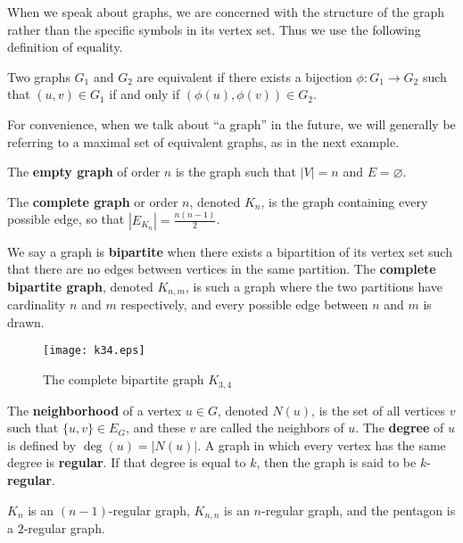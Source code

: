 When we speak about graphs, we are concerned with the structure of the graph
rather than the specific symbols in its vertex set. Thus we use the following
definition of equality.

\begin{definition}
  Two graphs $G_1$ and $G_2$ are equivalent if there exists a bijection $\phi : G_1 \to G_2$
  such that $(u,v) \in G_1$ if and only if $(\phi(u),\phi(v)) \in G_2$.
\end{definition}

For convenience, when we talk about ``a graph'' in the future, we will generally be referring to a
maximal set of equivalent graphs, as in the next example.

\begin{example}
  The \textbf{empty graph} of order $n$ is the graph such that $|V| = n$ and $E
  = \varnothing$.

  The \textbf{complete graph} or order $n$, denoted $K_n$, is the graph containing every possible
  edge, so that $|E_{K_n}| = \frac{n(n-1)}{2}$.

  We say a graph is \textbf{bipartite} when there exists a bipartition of its vertex set such that
  there are no edges between vertices in the same partition. The \textbf{complete bipartite graph},
  denoted $K_{n,m}$, is such a graph where the two partitions have cardinality $n$ and $m$
  respectively, and every possible edge between $n$ and $m$ is drawn.
\end{example}

\begin{figure}[H]
  \centering
  \texttt{[image: k34.eps]}
  \caption{The complete bipartite graph $K_{3,4}$}
  \label{fig:k34}
\end{figure}

\begin{definition}
  The \textbf{neighborhood} of a vertex $u \in G$, denoted $N(u)$, is the set of all vertices $v$
  such that $\{u,v\} \in E_G$, and these $v$ are called the neighbors of $u$. The \textbf{degree} of
  $u$ is defined by $\deg(u) = |N(u)|$. A graph in which every vertex has the same degree is
  \textbf{regular}. If that degree is equal to $k$, then the graph is said to be $k$-\textbf{regular}.
\end{definition}

\begin{example}
  $K_n$ is an $(n-1)$-regular graph, $K_{n,n}$ is an $n$-regular graph, and the pentagon is a
  $2$-regular graph.
\end{example}

